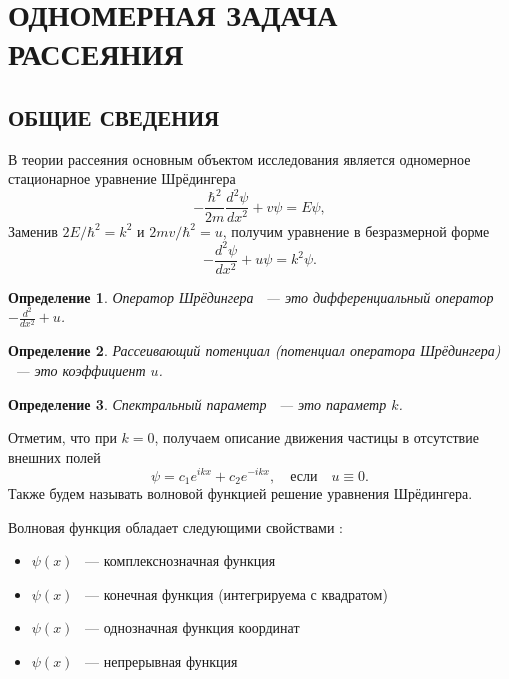 \documentclass[a4 paper, 12 pt]{extarticle}
\newtheorem{Def}{Определение}[section]
\begin{document}
	
	\newpage
	\section{ОДНОМЕРНАЯ ЗАДАЧА РАССЕЯНИЯ}
	\subsection{ОБЩИЕ СВЕДЕНИЯ}
	В теории рассеяния 
	основным объектом исследования является одномерное стационарное уравнение Шрёдингера
   \begin{equation*}
   -\frac{\hbar^2}{2m}\frac{d^2\psi}{d x^2}+v\psi=E\psi,
   \end{equation*}
   Заменив $2E/\hbar^2=k^2$ и $2mv/\hbar^2=u$, получим уравнение в безразмерной форме
   \begin{equation}\label{Schred1D}
   -\frac{d^2\psi}{d x^2}+u\psi=k^2\psi.
   \end{equation}
   
   \begin{Def}
   	Оператор Шрёдингера ~--- это дифференциальный оператор \newline  $-\frac{d^2}{d x^2}+u$.
   \end{Def}

   \begin{Def}
   	Рассеивающий потенциал (потенциал оператора Шрёдингера) ~--- это коэффициент $u$.
   \end{Def}

   \begin{Def}
    Спектральный параметр ~--- это параметр $k$.
   \end{Def}
	Отметим, что при $k=0$, получаем описание движения частицы в отсутствие внешних полей
	\begin{equation*}
	\psi=c_1e^{ikx}+c_2e^{-ikx}, \quad \text{если} \quad u\equiv0.
	\end{equation*}
    Также будем называть волновой функцией решение уравнения Шрёдингера.
    
    Волновая функция обладает следующими свойствами \cite{Peisakhovich, Landau}:
    \begin{itemize}
    	\item $\psi\left(x\right)$ ~--- комплекснозначная функция
    	\item $\psi\left(x\right)$ ~--- конечная функция (интегрируема с квадратом)
    	\item $\psi\left(x\right)$ ~--- однозначная функция координат
    	\item $\psi\left(x\right)$ ~--- непрерывная функция
    \end{itemize}
\end{document}
